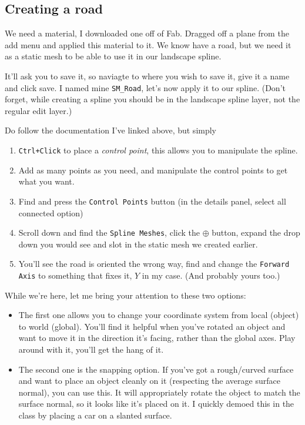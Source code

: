 \documentclass{article}
\begin{document}
	\subsection{Creating a road}
	We need a material, I downloaded one off of Fab. Dragged off a plane from the add menu and applied this material to it. We know have a road, but we need it as a static mesh to be able to use it in our landscape spline.
	
	It'll ask you to save it, so naviagte to where you wish to save it, give it a name and click save. I named mine \verb|SM_Road|, let's now apply it to our spline. (Don't forget, while creating a spline you should be in the landscape spline layer, not the regular edit layer.)

	Do follow the documentation I've linked above, but simply
	\begin{enumerate}
		\item \verb|Ctrl+Click| to place a \emph{control point}, this allows you to manipulate the spline.
		\item Add as many points as you need, and manipulate the control points to get what you want.
		\newpage
		\item Find and press the \verb|Control Points| button (in the details panel, select all connected option)
		\item Scroll down and find the \verb|Spline Meshes|, click the $\oplus$ button, expand the drop down you would see and slot in the static mesh we created earlier.
		\item You'll see the road is oriented the wrong way, find and change the \verb|Forward Axis| to something that fixes it, $Y$ in my case. (And probably yours too.) 
	\end{enumerate}

	While we're here, let me bring your attention to these two options:
	\begin{itemize}
		\item The first one allows you to change your coordinate system from local (object) to world (global). You'll find it helpful when you've rotated an object and want to move it in the direction it's facing, rather than the global axes. Play around with it, you'll get the hang of it.
		\item The second one is the snapping option. If you've got a rough/curved surface and want to place an object cleanly on it (respecting the average surface normal), you can use this. It will appropriately rotate the object to match the surface normal, so it looks like it's placed on it. I quickly demoed this in the class by placing a car on a slanted surface.
	\end{itemize}
\end{document}
